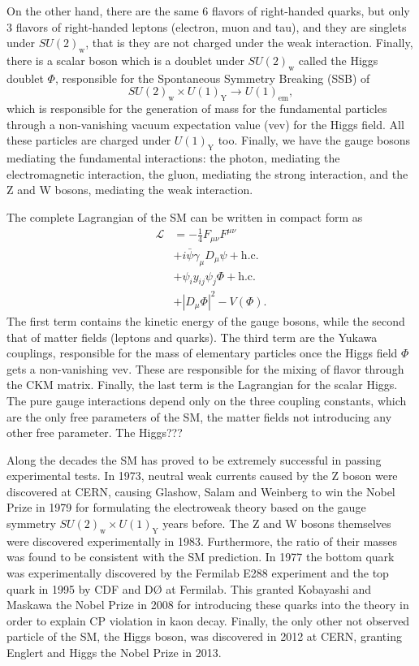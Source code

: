On the other hand, there are the same 6 flavors of right-handed quarks, but only 3 flavors of right-handed leptons (electron, muon and tau), and they are singlets under $SU(2)_{\textrm{w}}$, that is they are not charged under the weak interaction. Finally, there is a scalar boson which is a doublet under $SU(2)_{\textrm{w}}$ called the Higgs doublet $\Phi$, responsible for the Spontaneous Symmetry Breaking (SSB) of
\begin{equation}
SU(2)_{\textrm{w}}\times U(1)_{\textrm{Y}}\to U(1)_{\textrm{em}},
\end{equation}
which is responsible for the generation of mass for the fundamental particles through a non-vanishing vacuum expectation value (vev) for the Higgs field. All these particles are charged under $U(1)_{\textrm{Y}}$ too. Finally, we have the gauge bosons mediating the fundamental interactions: the photon, mediating the electromagnetic interaction, the gluon, mediating the strong interaction, and the Z and W bosons, mediating the weak interaction.

The complete Lagrangian of the SM can be written in compact form as
\begin{align}
\mathcal{L}&=-\frac{1}{4}F_{\mu\nu}F^{\mu\nu}\\
&+i\bar{\psi}\gamma_{\mu}D_{\mu}\psi+\textrm{h.c.}\\
&+\psi_iy_{ij}\psi_j\Phi+\textrm{h.c.}\\
&+|D_{\mu}\Phi|^2-V(\Phi).
\end{align}
The first term contains the kinetic energy of the gauge bosons, while the second that of matter fields (leptons and quarks). The third term are the Yukawa couplings, responsible for the mass of elementary particles once the Higgs field $\Phi$ gets a non-vanishing vev. These are responsible for the mixing of flavor through the CKM matrix. Finally, the last term is the Lagrangian for the scalar Higgs. The pure gauge interactions depend only on the three coupling constants, which are the only free parameters of the SM, the matter fields not introducing any other free parameter. The Higgs???

Along the decades the SM has proved to be extremely successful in passing experimental tests. In 1973, neutral weak currents caused by the Z boson were discovered at CERN, causing Glashow, Salam and Weinberg to win the Nobel Prize in 1979 for formulating the electroweak theory based on the gauge symmetry $SU(2)_{\textrm{w}}\times U(1)_{\textrm{Y}}$ years before. The Z and W bosons themselves were discovered experimentally in 1983. Furthermore, the ratio of their masses was found to be consistent with the SM prediction. In 1977 the bottom quark was experimentally discovered by the Fermilab E288 experiment and the top quark in 1995 by CDF and DØ at Fermilab. This granted Kobayashi and Maskawa the Nobel Prize in 2008 for introducing these quarks into the theory in order to explain CP violation in kaon decay. Finally, the only other not observed particle of the SM, the Higgs boson, was discovered in 2012 at CERN, granting Englert and Higgs the Nobel Prize in 2013.

